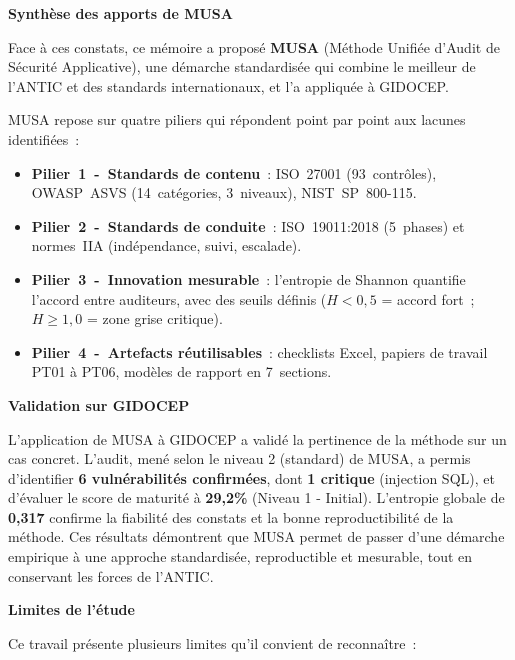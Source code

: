 \documentclass[12pt,a4paper,oneside]{report}
\begin{document}
\medskip

\noindent\textbf{Synthèse des apports de MUSA}

Face à ces constats, ce mémoire a proposé \textbf{MUSA} (Méthode
Unifiée d'Audit de Sécurité Applicative), une démarche standardisée
qui combine le meilleur de l'ANTIC et des standards internationaux,
et l'a appliquée à GIDOCEP.

MUSA repose sur quatre piliers qui répondent point par point aux lacunes
identifiées~:

\begin{itemize}[label={\color{gold}}, leftmargin=*]
	\item \textbf{Pilier~1~-~Standards de contenu}~: ISO~27001 (93~contrôles),
	OWASP~ASVS (14~catégories, 3~niveaux), NIST~SP~800-115.
	
	\item \textbf{Pilier~2~-~Standards de conduite}~: ISO~19011:2018
	(5~phases) et normes~IIA (indépendance, suivi, escalade).
	
	\item \textbf{Pilier~3~-~Innovation mesurable}~: l'entropie de Shannon
	quantifie l'accord entre auditeurs, avec des seuils définis
	($H < 0{,}5$ = accord fort~; $H \geq 1{,}0$ = zone grise critique).
	
	\item \textbf{Pilier~4~-~Artefacts réutilisables}~: checklists Excel,
	papiers de travail PT01 à PT06, modèles de rapport en 7~sections.
\end{itemize}

\medskip

\noindent\textbf{Validation sur GIDOCEP}

L'application de MUSA à GIDOCEP a validé la pertinence de la méthode
sur un cas concret. L'audit, mené selon le niveau 2 (standard) de MUSA,
a permis d'identifier \textbf{6 vulnérabilités confirmées}, dont
\textbf{1 critique} (injection SQL), et d'évaluer le score de maturité
à \textbf{29,2\%} (Niveau 1 - Initial). L'entropie globale de
\textbf{0,317} confirme la fiabilité des constats et la bonne
reproductibilité de la méthode. Ces résultats démontrent que MUSA
permet de passer d'une démarche empirique à une approche standardisée,
reproductible et mesurable, tout en conservant les forces de l'ANTIC.

\medskip

\noindent\textbf{Limites de l'étude}

Ce travail présente plusieurs limites qu'il convient de reconnaître~:
\end{document}
